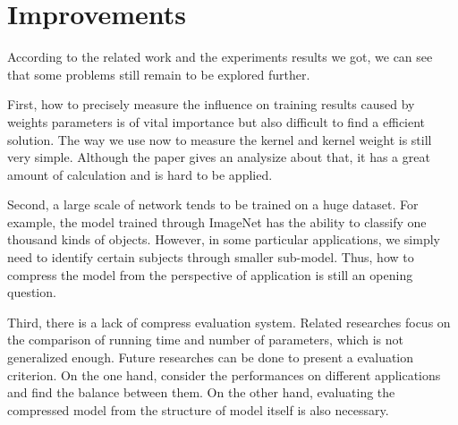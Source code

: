 \documentclass[a4paper]{article}
\begin{document}
\section{Improvements}
\par According to the related work and the experiments results we got, we can see that some problems still remain to be explored further. \par First, how to precisely measure the influence on training results caused by weights parameters is of vital importance but also difficult to find a efficient solution. The way we use now to measure the kernel and kernel weight is still very simple. Although the paper \cite{design} gives an analysize about that, it has a great amount of calculation and is hard to be applied. 
\par Second, a large scale of network tends to be trained on a huge dataset. For example, the model trained through ImageNet has the ability to classify one thousand kinds of objects. However, in some particular applications, we simply need to identify certain subjects through smaller sub-model. Thus, how to compress the model from the perspective of application is still an opening question.
\par Third, there is a lack of compress evaluation system. Related researches focus on the comparison of running time and number of parameters, which is not generalized enough. Future researches can be done to present a  evaluation criterion. On the one hand, consider the performances on different applications and find the balance between them. On the other hand, evaluating the compressed model from the structure of model itself is also necessary.



\end{document}
